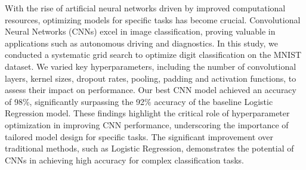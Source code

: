 With the rise of artificial neural networks driven by improved computational resources, optimizing models for specific tasks has become crucial. Convolutional Neural Networks (CNNs) excel in image classification, proving valuable in applications such as autonomous driving and diagnostics. In this study, we conducted a systematic grid search to optimize digit classification on the MNIST dataset. We varied key hyperparameters, including the number of convolutional layers, kernel sizes, dropout rates, pooling, padding and activation functions, to assess their impact on performance. Our best CNN model achieved an accuracy of 98\%, significantly surpassing the 92\% accuracy of the baseline Logistic Regression model. These findings highlight the critical role of hyperparameter optimization in improving CNN performance, underscoring the importance of tailored model design for specific tasks. The significant improvement over traditional methods, such as Logistic Regression, demonstrates the potential of CNNs in achieving high accuracy for complex classification tasks.
